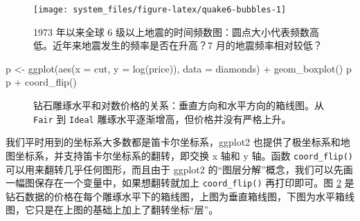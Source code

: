 \documentclass[
  b5paper,
  UTF8,twoside]{book}
\newenvironment{Shaded}{\begin{snugshade}}{\end{snugshade}}
\newcommand{\AttributeTok}[1]{\textcolor[rgb]{0.77,0.63,0.00}{#1}}
\newcommand{\FunctionTok}[1]{\textcolor[rgb]{0.00,0.00,0.00}{#1}}
\newcommand{\NormalTok}[1]{#1}
\newcommand{\OtherTok}[1]{\textcolor[rgb]{0.56,0.35,0.01}{#1}}
\newcommand{\SpecialCharTok}[1]{\textcolor[rgb]{0.00,0.00,0.00}{#1}}
\begin{document}
\begin{figure}

{\centering \texttt{[image: system\_files/figure-latex/quake6-bubbles-1]} 

}

\caption[1973 年以来全球 6 级以上地震的时间频数图]{1973 年以来全球 6 级以上地震的时间频数图：圆点大小代表频数高低。近年来地震发生的频率是否在升高？7 月的地震频率相对较低？}\label{fig:quake6-bubbles}
\end{figure}





\begin{Shaded}
\begin{Highlighting}[]
\NormalTok{p }\OtherTok{\textless{}{-}} \FunctionTok{ggplot}\NormalTok{(}\FunctionTok{aes}\NormalTok{(}\AttributeTok{x =}\NormalTok{ cut, }\AttributeTok{y =} \FunctionTok{log}\NormalTok{(price)), }\AttributeTok{data =}\NormalTok{ diamonds) }\SpecialCharTok{+}
  \FunctionTok{geom\_boxplot}\NormalTok{()}
\NormalTok{p}
\NormalTok{p }\SpecialCharTok{+} \FunctionTok{coord\_flip}\NormalTok{()}
\end{Highlighting}
\end{Shaded}

\begin{figure}

{\centering {}\newline{}

}

\caption[钻石雕琢水平和对数价格的关系]{钻石雕琢水平和对数价格的关系：垂直方向和水平方向的箱线图。从 \texttt{Fair} 到 \texttt{Ideal} 雕琢水平逐渐增高，但价格并没有严格上升。}\label{fig:diamonds-cut}
\end{figure}





我们平时用到的坐标系大多数都是笛卡尔坐标系，ggplot2 也提供了极坐标系和地图坐标系，并支持笛卡尔坐标系的翻转，即交换 x 轴和 y 轴。函数 \texttt{coord\_flip()} 可以用来翻转几乎任何图形，而且由于 ggplot2 的``图层分解''概念，我们可以先画一幅图保存在一个变量中，如果想翻转就加上 \texttt{coord\_flip()} 再打印即可。图 \ref{fig:diamonds-cut} 是钻石数据的价格在每个雕琢水平下的箱线图，上图为垂直箱线图，下图为水平箱线图，它只是在上图的基础上加上了翻转坐标``层''。
\end{document}
